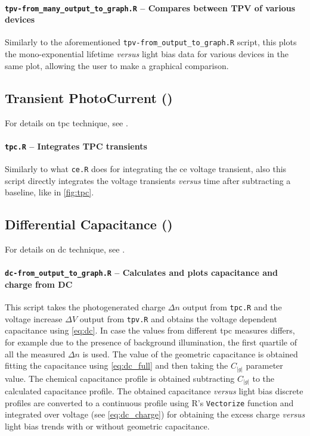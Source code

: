 		\paragraph{\texttt{tpv-\-from\_many\_output\_to\_graph.R} -- Compares between TPV of various devices}
		Similarly to the aforementioned \texttt{tpv-\-from\_output\_to\_graph.R} script, this plots the mono\hyp{}exponential lifetime \textsl{versus} light bias data for various devices in the same plot, allowing the user to make a graphical comparison.
%
	\subsection{Transient PhotoCurrent ()}\label{r_tpc}
	For details on \gls{tpc} technique, see .

		\paragraph{\texttt{tpc.R} -- Integrates TPC transients}
		Similarly to what \texttt{ce.R} does for integrating the \gls{ce} voltage transient, also this script directly integrates the voltage transients \textsl{versus} time after subtracting a baseline, like in \cref{fig:tpc}.
		
%
%
	\subsection{Differential Capacitance ()}\label{r_dc}
	For details on \gls{dc} technique, see .

		\paragraph{\texttt{dc-\-from\_output\_to\_graph.R} -- Calculates and plots capacitance and charge from DC}
		This script takes the photogenerated charge $\Delta n$ output from \texttt{tpc.R} and the voltage increase $\Delta V$ output from \texttt{tpv.R} and obtains the voltage dependent capacitance using \cref{eq:dc}.
		In case the values from different \gls{tpc} measures differs, for example due to the presence of background illumination, the first quartile of all the measured $\Delta n$ is used.
		The value of the geometric capacitance is obtained fitting the capacitance using \cref{eq:dc_full} and then taking the $C_|g|$ parameter value.
		The chemical capacitance profile is obtained subtracting $C_|g|$ to the calculated capacitance profile.
		The obtained capacitance \textsl{versus} light bias discrete profiles are converted to a continuous profile using R's \texttt{Vectorize} function and integrated over voltage (see \cref{eq:dc_charge}) for obtaining the excess charge \textsl{versus} light bias trends with or without geometric capacitance.

